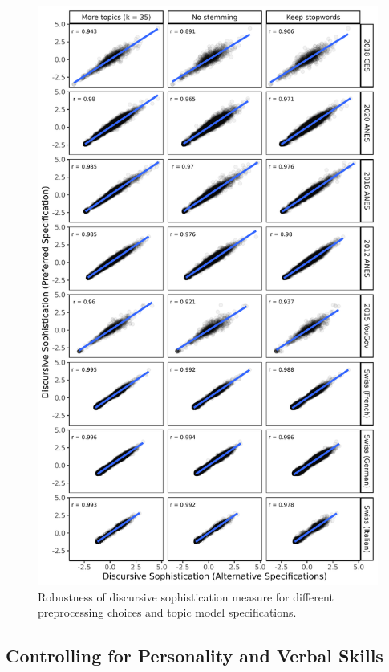 \documentclass[12pt]{article}
\begin{document}
\begin{figure}[h]\centering
	\includegraphics{../out/appC2-pretext_robustness.png}
	\caption[Robustness of discursive sophistication measure for different preprocessing choices and topic model specifications]{Robustness of discursive sophistication measure for different preprocessing choices and topic model specifications.}\label{fig:pretext_robustness}
\end{figure}


\clearpage
\subsection{Controlling for Personality and Verbal Skills}\label{app:personality}
\end{document}
